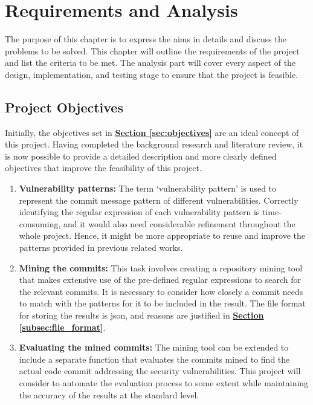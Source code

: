 \documentclass[12pt, a4paper]{report}
\begin{document}
\chapter{Requirements and Analysis}
The purpose of this chapter is to express the aims in details and discuss the problems to be solved.
This chapter will outline the requirements of the project and list the criteria to be met. The
analysis part will cover every aspect of the design, implementation, and testing stage to ensure
that the project is feasible.

\section{Project Objectives}
Initially, the objectives set in \hyperref[sec:objectives]{\textbf{Section \ref*{sec:objectives}}}
are an ideal concept of this project. Having completed the background research and literature
review, it is now possible to provide a detailed description and more clearly defined objectives
that improve the feasibility of this project.

\begin{enumerate}
  \item \textbf{Vulnerability patterns:} The term `vulnerability pattern' is used to represent the
  commit message pattern of different vulnerabilities. Correctly identifying the regular expression
  of each vulnerability pattern is time-consuming, and it would also need considerable refinement
  throughout the whole project. Hence, it might be more appropriate to reuse and improve the
  patterns provided in previous related works.
  \item \textbf{Mining the commits:} This task involves creating a repository mining tool that makes
  extensive use of the pre-defined regular expressions to search for the relevant commits. It is
  necessary to consider how closely a commit needs to match with the patterns for it to be included
  in the result. The file format for storing the results is \acrshort{json}, and reasons are
  justified in \hyperref[subsec:file_format]{\textbf{Section \ref*{subsec:file_format}}}.
  \item \textbf{Evaluating the mined commits:} The mining tool can be extended to include a separate
  function that evaluates the commits mined to find the actual code commit addressing the security
  vulnerabilities. This project will consider to automate the evaluation process to some extent
  while maintaining the accuracy of the results at the standard level.
\end{enumerate}
\end{document}
